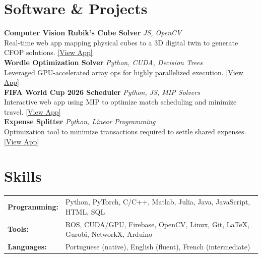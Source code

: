 \documentclass[letterpaper,10pt]{article}
\begin{document}
\section{Software \& Projects}
\textbf{Computer Vision Rubik's Cube Solver} \hfill \textit{JS, OpenCV} \\
Real-time web app mapping physical cubes to a 3D digital twin to generate CFOP solutions. \href{https://igorlucindo.github.io/rubiks-cube-tutorial-APP/}{\color{darkblue}[View App]} \\[3pt]
\textbf{Wordle Optimization Solver} \hfill \textit{Python, CUDA, Decision Trees} \\
Leveraged GPU-accelerated array ops for highly parallelized execution. \href{https://igorlucindo.github.io/wordle-optimization-GAME/}{\color{darkblue}[View App]} \\[3pt]
\textbf{FIFA World Cup 2026 Scheduler} \hfill \textit{Python, JS, MIP Solvers} \\
Interactive web app using MIP to optimize match scheduling and minimize travel. \href{https://igorlucindo.github.io/fifa-world-cup-2026-scheduler-APP/}{\color{darkblue}[View App]} \\[3pt]
\textbf{Expense Splitter} \hfill \textit{Python, Linear Programming} \\
Optimization tool to minimize transactions required to settle shared expenses. \href{https://igorlucindo.github.io/expense-splitter-APP/}{\color{darkblue}[View App]}

\section{Skills}
\begin{tabular}{@{}l l@{}}
    \textbf{Programming:} & Python, PyTorch, C/C++, Matlab, Julia, Java, JavaScript, HTML, SQL \\
    \textbf{Tools:} & ROS, CUDA/GPU, Firebase, OpenCV, Linux, Git, \LaTeX, Gurobi, NetworkX, Arduino \\
    \textbf{Languages:} & Portuguese (native), English (fluent), French (intermediate) \\
\end{tabular}
\end{document}
